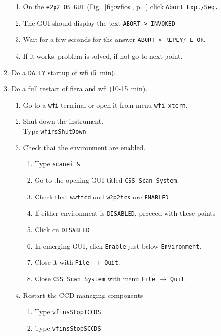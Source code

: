 \documentclass[11pt,fleqn]{book}
\def\figref#1{Fig.~\ref{fig:#1}, p.~\pageref{fig:#1}}
\begin{document}
\begin{enumerate}
\begin{enumerate}
\begin{enumerate}
           \item On the \texttt{e2p2 OS GUI} (\figref{wfios}) click \texttt{Abort Exp./Seq.}
           \item The GUI should display the text \texttt{ABORT    > INVOKED}
           \item Wait for a few seconds for the answer \texttt{ABORT    > REPLY/ L   OK}.
           \item If it works, problem is solved, if not go to next point.
        \end{enumerate}
      \item Do a \texttt{DAILY} startup of \gls{wfi} (5~min).
      \item\label{list:wfifierarestart} Do a full restart of \gls{fiera} and \gls{wfi} (10-15~min).
        \begin{enumerate}
          \item Go to a \texttt{wfi} terminal or open it from menu \texttt{wfi xterm}.
          \item Shut down the instrument.\\
                Type \texttt{wfinsShutDown}
          \item Check that the environment are enabled.
             \begin{enumerate}
               \item Type \texttt{scanei \&} 
               \item Go to the opening GUI titled \texttt{CSS Scan System}.
               \item Check that \texttt{wwffcd} and \texttt{w2p2tcs} are \texttt{ENABLED}
               \item If either environment is \texttt{DISABLED}, proceed with these points
               \item Click on \texttt{DISABLED}
               \item In emerging GUI, click \texttt{Enable} just below \texttt{Environment}.
               \item Close it with \texttt{File} $\rightarrow$ \texttt{Quit}.
               \item Close \texttt{CSS Scan System} with menu \texttt{File} $\rightarrow$ \texttt{Quit}.
            \end{enumerate} 
          \item Restart the CCD managing components
             \begin{enumerate} 
               \item Type \texttt{wfinsStopTCCDS}
               \item Type \texttt{wfinsStopSCCDS}

\end{enumerate}
\end{enumerate}
\end{enumerate}
\end{enumerate}
\end{document}
